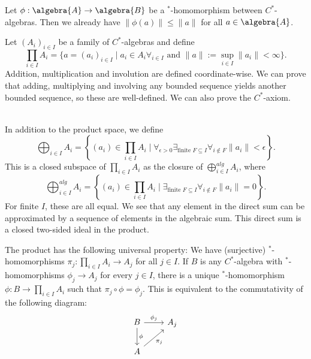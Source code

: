 \documentclass[a4paper]{article}
\begin{document}
\begin{theorem}
	Let $\phi: \algebra{A} \to \algebra{B}$ be a $^*$-homomorphism between $C^*$-algebras. Then we already have $\|\phi(a)\| \leq \|a\|$ for all $a \in \algebra{A}$.
\end{theorem}

\begin{exercise}[4 - Products]
	Let $(A_i)_{i \in I}$ be a family of $C^*$-algebras and define
	\begin{equation*}
		\prod_{i \in I} A_i = \{a = (a_i)_{i \in I} \mid a_i \in A_i \forall_{i \in I} \text{ and } \|a\| := \sup_{i \in I} \|a_i\| < \infty \}\text{.}
	\end{equation*}
	Addition, multiplication and involution are defined coordinate-wise. We can prove that adding, multiplying and involving any bounded sequence yields another bounded sequence, so these are well-defined. We can also prove the $C^*$-axiom.
\end{exercise}

\begin{remark}~\\
	In addition to the product space, we define
	\begin{equation*}
		\bigoplus_{i \in I} A_i = \left\{(a_i) \in \prod_{i \in I} A_i \mid \forall_{\epsilon > 0} \exists_{\text{finite }F \subseteq I} \forall_{i \notin F} \|a_i\| < \epsilon\right\}\text{.}
	\end{equation*}
	This is a closed subspace of $\prod_{i \in I} A_i$ as the closure of $\bigoplus_{i \in I}^{alg} A_i$, where
	\begin{equation*}
		\bigoplus_{i \in I}^{alg} A_i = \left\{(a_i) \in \prod_{i \in I} A_i \mid \exists_{\text{finite }F \subseteq I} \forall_{i \notin F} \|a_i\| = 0\right\}\text{.}
	\end{equation*}
	For finite $I$, these are all equal. We see that any element in the direct sum can be approximated by a sequence of elements in the algebraic sum. This direct sum is a closed two-sided ideal in the product.

	The product has the following universal property:
	We have (surjective) $^*$-homomorphisms $\pi_j:  \prod_{i \in I} A_i \to A_j$ for all $j \in I$.
	If $B$ is any $C^*$-algebra with $^*$-homomorphisms $\phi_j \to A_j$ for every $j \in I$, there is a unique $^*$-homomorphism $\phi: B \to \prod_{i \in I} A_i$ such that  $\pi_j \circ \phi = \phi_j$.
	This is equivalent to the commutativity of the following diagram:
	\begin{equation*}
		\begin{tikzcd}
			B \arrow{r}{\phi_j} \arrow{d}{\phi} & A_j\\
			A  \arrow[swap]{ur}{\pi_j}
		\end{tikzcd}
	\end{equation*}
\end{remark}
\end{document}
